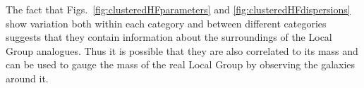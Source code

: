 \documentclass[english, twoside]{HYgradu}
\begin{document}
The fact that Figs.~\ref{fig:clusteredHFparameters} and \ref{fig:clusteredHFdispersions} show variation both within each category and between different categories suggests that they contain information about the surroundings of the Local Group analogues. Thus it is possible that they are also correlated to its mass and can be used to gauge the mass of the real Local Group by observing the galaxies around it.






%
%
%
\end{document}
